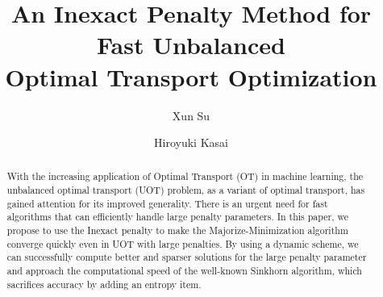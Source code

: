 \usepackage{amsthm}
\usepackage{amsfonts}
\usepackage{amsmath}
\usepackage{amssymb,bbm}
\usepackage{dsfont}
\usepackage{bm}
\usepackage{graphicx}
\usepackage{algorithm}
\usepackage{algorithmic}

\usepackage{color}

\newcommand{\R}{\mathbb{R}}
\newcommand{\one}{\mathds{1}}
\newcommand{\mat}[1]{\mathbf{#1}}
\renewcommand{\vec}[1]{\bm{#1}}

\title{An Inexact Penalty Method for Fast Unbalanced \protect\\ Optimal Transport Optimization}

\address{ Xun Su, Waseda University, 3-4-1 Okubo, Shinjuku-ku, Tokyo 169-8555, Japan}

\author{%
Xun Su\first
\and
Hiroyuki Kasai\second
}



\begin{abstract}
With the increasing application of Optimal Transport (OT) in machine learning, the unbalanced optimal transport (UOT) problem, as a variant of optimal transport, has gained attention for its improved generality. There is an urgent need for fast algorithms that can efficiently handle large penalty parameters. In this paper, we propose to use the Inexact penalty to make the Majorize-Minimization algorithm converge quickly even in UOT with large penalties. By using a dynamic scheme, we can successfully compute better and sparser solutions for the large penalty parameter and approach the computational speed of the well-known Sinkhorn algorithm, which sacrifices accuracy by adding an entropy item.
\end{abstract}

\def\Style{``jsaiac.sty''}
\def\BibTeX{{\rm B\kern-.05em{\sc i\kern-.025em b}\kern-.08em%
T\kern-.1667em\lower.7ex\hbox{E}\kern-.125emX}}
\def\JBibTeX{\leavevmode\lower .6ex\hbox{J}\kern-0.15em\BibTeX}
\def\LaTeXe{\LaTeX\kern.15em2$_{\textstyle\varepsilon}$}


